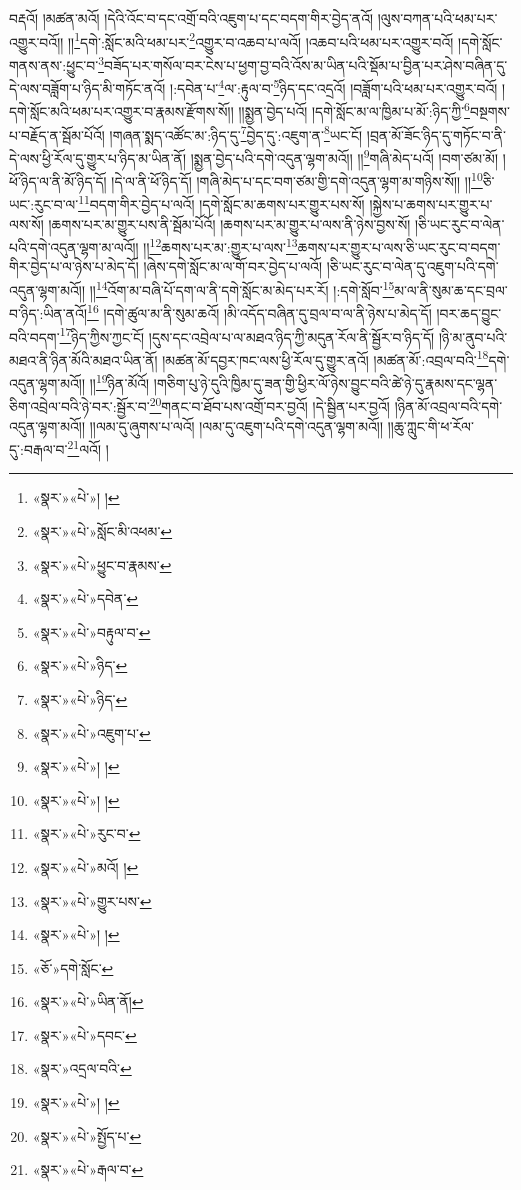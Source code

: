 བརྡའོ། །མཚན་མའོ། །དེའི་འོང་བ་དང་འགྲོ་བའི་འཇུག་པ་དང་བདག་གིར་བྱེད་ནའོ། །ལུས་བཀན་པའི་ཕམ་པར་འགྱུར་བའོ།། །།\footnote{«སྣར་»«པེ་»། །}དགེ་:སློང་མའི་ཕམ་པར་\footnote{«སྣར་»«པེ་»སློང་མི་འཕམ་}འགྱུར་བ་འཆབ་པ་ལའོ། །འཆབ་པའི་ཕམ་པར་འགྱུར་བའོ། །དགེ་སློང་གནས་ནས་:ཕྱུང་བ་\footnote{«སྣར་»«པེ་»ཕྱུང་བ་རྣམས་}བཟོད་པར་གསོལ་བར་ངེས་པ་ཕྱག་བྱ་བའི་འོས་མ་ཡིན་པའི་སྡོམ་པ་བྱིན་པར་ཤེས་བཞིན་དུ་དེ་ལས་བཟློག་པ་ཉིད་མི་གཏོང་ནའོ། །:དབེན་པ་\footnote{«སྣར་»«པེ་»དབེན་}ལ་:རྟུལ་བ་\footnote{«སྣར་»«པེ་»བརྟུལ་བ་}ཉིད་དང་འདྲའོ། །བཟློག་པའི་ཕམ་པར་འགྱུར་བའོ། །དགེ་སློང་མའི་ཕམ་པར་འགྱུར་བ་རྣམས་རྫོགས་སོ།། །།སྨྱན་བྱེད་པའོ། །དགེ་སློང་མ་ལ་ཁྱིམ་པ་མོ་:ཉིད་ཀྱི་\footnote{«སྣར་»«པེ་»ཉིད་}བསྔགས་པ་བརྗོད་ན་སྦོམ་པོའོ། །གཞན་སྨད་འཚོང་མ་:ཉིད་དུ་\footnote{«སྣར་»«པེ་»ཉིད་}བྱེད་དུ་:འཇུག་ན་\footnote{«སྣར་»«པེ་»འཇུག་པ་}ཡང་ངོ། །བྲན་མོ་ཟོང་ཉིད་དུ་གཏོང་བ་ནི་དེ་ལས་ཕྱི་རོལ་དུ་གྱུར་པ་ཉིད་མ་ཡིན་ནོ། །སྨྱན་བྱེད་པའི་དགེ་འདུན་ལྷག་མའོ།། །།\footnote{«སྣར་»«པེ་»། །}གཞི་མེད་པའོ། །བག་ཙམ་མོ། །ཕོ་ཉིད་ལ་ནི་མོ་ཉིད་དོ། །དེ་ལ་ནི་ཕོ་ཉིད་དོ། །གཞི་མེད་པ་དང་བག་ཙམ་གྱི་དགེ་འདུན་ལྷག་མ་གཉིས་སོ།། །།\footnote{«སྣར་»«པེ་»། །}ཅི་ཡང་:རུང་བ་ལ་\footnote{«སྣར་»«པེ་»རུང་བ་}བདག་གིར་བྱེད་པ་ལའོ། །དགེ་སློང་མ་ཆགས་པར་གྱུར་པས་སོ། །སྐྱེས་པ་ཆགས་པར་གྱུར་པ་ལས་སོ། །ཆགས་པར་མ་གྱུར་པས་ནི་སྦོམ་པོའོ། །ཆགས་པར་མ་གྱུར་པ་ལས་ནི་ཉེས་བྱས་སོ། །ཅི་ཡང་རུང་བ་ལེན་པའི་དགེ་འདུན་ལྷག་མ་ལའོ།། །།\footnote{«སྣར་»«པེ་»མའོ། །}ཆགས་པར་མ་:གྱུར་པ་ལས་\footnote{«སྣར་»«པེ་»གྱུར་པས་}ཆགས་པར་གྱུར་པ་ལས་ཅི་ཡང་རུང་བ་བདག་གིར་བྱེད་པ་ལ་ཉེས་པ་མེད་དོ། །ཞེས་དགེ་སློང་མ་ལ་གོ་བར་བྱེད་པ་ལའོ། །ཅི་ཡང་རུང་བ་ལེན་དུ་འཇུག་པའི་དགེ་འདུན་ལྷག་མའོ།། །།\footnote{«སྣར་»«པེ་»། །}འོག་མ་བཞི་པོ་དག་ལ་ནི་དགེ་སློང་མ་མེད་པར་རོ། །:དགེ་སློབ་\footnote{«ཅོ་»དགེ་སློང་}མ་ལ་ནི་སུམ་ཆ་དང་བྲལ་བ་ཉིད་:ཡིན་ནའོ།\footnote{«སྣར་»«པེ་»ཡིན་ནོ།} །དགེ་ཚུལ་མ་ནི་སུམ་ཆའོ། །མི་འདོད་བཞིན་དུ་བྲལ་བ་ལ་ནི་ཉེས་པ་མེད་དོ། །བར་ཆད་བྱུང་བའི་བདག་\footnote{«སྣར་»«པེ་»དབང་}ཉིད་ཀྱིས་ཀྱང་ངོ། །དུས་དང་འབྲེལ་པ་ལ་མཐའ་ཉིད་ཀྱི་མདུན་རོལ་ནི་སྦྱོར་བ་ཉིད་དོ། །ཉི་མ་ནུབ་པའི་མཐའ་ནི་ཉིན་མོའི་མཐའ་ཡིན་ནོ། །མཚན་མོ་དབྱར་ཁང་ལས་ཕྱི་རོལ་དུ་གྱུར་ནའོ། །མཚན་མོ་:འབྲལ་བའི་\footnote{«སྣར་»འདྲལ་བའི་}དགེ་འདུན་ལྷག་མའོ།། །།\footnote{«སྣར་»«པེ་»། །}ཉིན་མོའོ། །གཅིག་པུ་ཉེ་དུའི་ཁྱིམ་དུ་ཟན་གྱི་ཕྱིར་ལོ་ཉེས་བྱུང་བའི་ཚེ་ཉེ་དུ་རྣམས་དང་ལྷན་ཅིག་འབྲེལ་བའི་ཉེ་བར་:སྦྱོར་བ་\footnote{«སྣར་»«པེ་»སྤྱོད་པ་}གནང་བ་ཐོབ་པས་འགྲོ་བར་བྱའོ། །དེ་སྦྱིན་པར་བྱའོ། །ཉིན་མོ་འབྲལ་བའི་དགེ་འདུན་ལྷག་མའོ།། །།ལམ་དུ་ཞུགས་པ་ལའོ། །ལམ་དུ་འཇུག་པའི་དགེ་འདུན་ལྷག་མའོ།། །།ཆུ་ཀླུང་གི་ཕ་རོལ་དུ་:བརྒལ་བ་\footnote{«སྣར་»«པེ་»རྒལ་བ་}ལའོ། །
